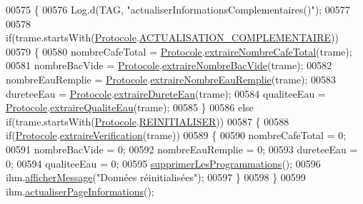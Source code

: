 \begin{DoxyCode}
00575     \{
00576         Log.d(TAG, \textcolor{stringliteral}{"actualiserInformationsComplementaires()"});
00577 
00578         \textcolor{keywordflow}{if}(trame.startsWith(\hyperlink{classcom_1_1example_1_1ekawa_1_1_protocole}{Protocole}.\hyperlink{classcom_1_1example_1_1ekawa_1_1_protocole_a7751357fc287fe44de89ebd3fc9cee9b}{ACTUALISATION\_COMPLEMENTAIRE}))
00579         \{
00580             nombreCafeTotal = \hyperlink{classcom_1_1example_1_1ekawa_1_1_protocole}{Protocole}.\hyperlink{classcom_1_1example_1_1ekawa_1_1_protocole_ad76b79c64aaa9abed9a1219f3f28cb9a}{extraireNombreCafeTotal}(trame);
00581             nombreBacVide = \hyperlink{classcom_1_1example_1_1ekawa_1_1_protocole}{Protocole}.\hyperlink{classcom_1_1example_1_1ekawa_1_1_protocole_a7cdbcbd7aa67f4b0cebb963725b0c67e}{extraireNombreBacVide}(trame);
00582             nombreEauRemplie = \hyperlink{classcom_1_1example_1_1ekawa_1_1_protocole}{Protocole}.\hyperlink{classcom_1_1example_1_1ekawa_1_1_protocole_ae4aa9859ca0f359284c931e31732477f}{extraireNombreEauRemplie}(trame);
00583             dureteeEau = \hyperlink{classcom_1_1example_1_1ekawa_1_1_protocole}{Protocole}.\hyperlink{classcom_1_1example_1_1ekawa_1_1_protocole_a3d092fccea3a5bf3a92810dbe90603b0}{extraireDureteEau}(trame);
00584             qualiteeEau = \hyperlink{classcom_1_1example_1_1ekawa_1_1_protocole}{Protocole}.\hyperlink{classcom_1_1example_1_1ekawa_1_1_protocole_a8f7c96aaa3fad76354e1cb4665c85e57}{extraireQualiteEau}(trame);
00585         \}
00586         \textcolor{keywordflow}{else} \textcolor{keywordflow}{if}(trame.startsWith(\hyperlink{classcom_1_1example_1_1ekawa_1_1_protocole}{Protocole}.\hyperlink{classcom_1_1example_1_1ekawa_1_1_protocole_add67f8989ac6672f498b8c9f085cd445}{REINITIALISER}))
00587         \{
00588             \textcolor{keywordflow}{if}(\hyperlink{classcom_1_1example_1_1ekawa_1_1_protocole}{Protocole}.\hyperlink{classcom_1_1example_1_1ekawa_1_1_protocole_add9d5727209d29af21fa468e6929fe0b}{extraireVerification}(trame))
00589             \{
00590                 nombreCafeTotal = 0;
00591                 nombreBacVide = 0;
00592                 nombreEauRemplie = 0;
00593                 dureteeEau = 0;
00594                 qualiteeEau = 0;
00595                 \hyperlink{classcom_1_1example_1_1ekawa_1_1_cafetiere_a6d1bc4321c372f7639a3305cf74f10db}{supprimerLesProgrammations}();
00596                 ihm.\hyperlink{classcom_1_1example_1_1ekawa_1_1_ihm_ab1ca33ad18d42540299e3a58a82f4d9a}{afficherMessage}(\textcolor{stringliteral}{"Données réinitialisées"});
00597             \}
00598         \}
00599         ihm.\hyperlink{classcom_1_1example_1_1ekawa_1_1_ihm_a2422719a8e893b23e95f80b5899adb76}{actualiserPageInformations}();

\end{DoxyCode}
